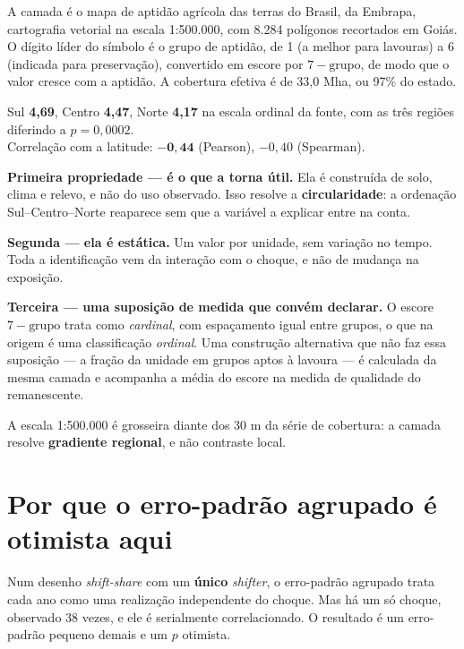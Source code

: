 A camada é o mapa de aptidão agrícola das terras do Brasil, da Embrapa,
cartografia vetorial na escala 1:500.000, com 8.284 polígonos recortados em
Goiás. O dígito líder do símbolo é o grupo de aptidão, de 1 (a melhor para
lavouras) a 6 (indicada para preservação), convertido em escore por
$7 - \text{grupo}$, de modo que o valor cresce com a aptidão. A cobertura
efetiva é de 33,0 Mha, ou 97\% do estado.

\begin{ancora}
Sul \textbf{4,69}, Centro \textbf{4,47}, Norte \textbf{4,17} na escala ordinal
da fonte, com as três regiões diferindo a $p = 0{,}0002$. \\
Correlação com a latitude: $\mathbf{-0{,}44}$ (Pearson), $-0{,}40$ (Spearman).
\end{ancora}

\textbf{Primeira propriedade --- é o que a torna útil.} Ela é construída de
solo, clima e relevo, e não do uso observado. Isso resolve a
\textbf{circularidade}: a ordenação Sul--Centro--Norte reaparece sem que a
variável a explicar entre na conta.

\textbf{Segunda --- ela é estática.} Um valor por unidade, sem variação no
tempo. Toda a identificação vem da interação com o choque, e não de mudança na
exposição.

\textbf{Terceira --- uma suposição de medida que convém declarar.} O escore
$7 - \text{grupo}$ trata como \emph{cardinal}, com espaçamento igual entre
grupos, o que na origem é uma classificação \emph{ordinal}. Uma construção
alternativa que não faz essa suposição --- a fração da unidade em grupos aptos
à lavoura --- é calculada da mesma camada e acompanha a média do escore na
medida de qualidade do remanescente.

\begin{naodiz}
A escala 1:500.000 é grosseira diante dos 30 m da série de cobertura: a camada
resolve \textbf{gradiente regional}, e não contraste local.
\end{naodiz}

\section{Por que o erro-padrão agrupado é otimista aqui}

Num desenho \emph{shift-share} com um \textbf{único} \emph{shifter}, o
erro-padrão agrupado trata cada ano como uma realização independente do choque.
Mas há um só choque, observado 38 vezes, e ele é serialmente correlacionado. O
resultado é um erro-padrão pequeno demais e um $p$ otimista.

